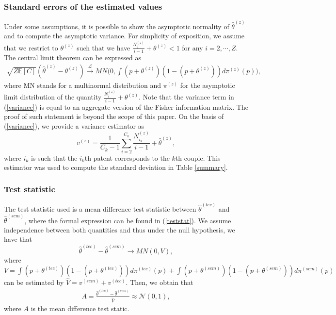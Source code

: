 \subsubsection*{Standard errors of the estimated values}
Under some assumptions, it is possible to show the asymptotic normality of $\widehat{\theta}^{(z)}$ and to compute the asymptotic variance. For simplicity of exposition, we assume that we restrict to $\theta^{(z)}$ such that we have $\frac{N_{i}^{(z)}}{i-1} + \theta^{(z)} < 1$ for any $i=2, \cdots, Z$. The central limit theorem can be expressed as 
\begin{eqnarray}
\label{variance}
\sqrt{Z \mathbb{E} [ C ]} (\widehat{\theta}^{(z)} - \theta^{(z)}) \overset{\mathcal{L}}{\rightarrow} MN \Big( 0, \int (p + \theta^{(z)})(1 - (p + \theta^{(z)})) d\pi^{(z)} (p) \Big),
\end{eqnarray}
where MN stands for a multinormal distribution and $\pi^{(z)}$ for the asymptotic limit distribution of the quantity $\frac{N_{i}^{(z)}}{i-1} + \theta^{(z)}$. Note that the variance term in (\ref{variance}) is equal to an aggregate version of the Fisher information matrix. The proof of such statement is beyond the scope of this paper. On the basis of (\ref{variance}), we provide a variance estimator as 
$$v^{(z)} = \frac{1}{C_k-1}\sum_{i=2}^{C_k}  \frac{N_{i_k}^{(z)}}{i-1} + \widehat{\theta}^{(z)},$$ 
where $i_k$ is such that the $i_k$th patent corresponds to the $k$th couple. This estimator was used to compute the standard deviation in Table \ref{summary}.
\subsubsection*{Test statistic}
The test statistic used is a mean difference test statistic between $\widehat{\theta}^{(tec)}$ and  $\widehat{\theta}^{(sem)}$, where the formal expression can be found in (\ref{teststat}). We assume independence between both quantities and thus under the null hypothesis, we have that 
$$\widehat{\theta}^{(tec)} - \widehat{\theta}^{(sem)} {\rightarrow} MN(0,V),$$
where $V= \int (p + \theta^{(tec)})(1 - (p + \theta^{(tec)})) d\pi^{(tec)} (p) + \int (p + \theta^{(sem)})(1 - (p + \theta^{(sem)})) d\pi^{(sem)} (p)$ can be estimated by $\widehat{V} = v^{(sem)} + v^{(tec)}$. Then, we obtain that 
\begin{eqnarray}
\label{teststat}
A = \frac{\widehat{\theta}^{(tec)} - \widehat{\theta}^{(sem)}}{\widehat{V}} \approx \mathcal{N} (0,1),
\end{eqnarray}
where $A$ is the mean difference test static.







